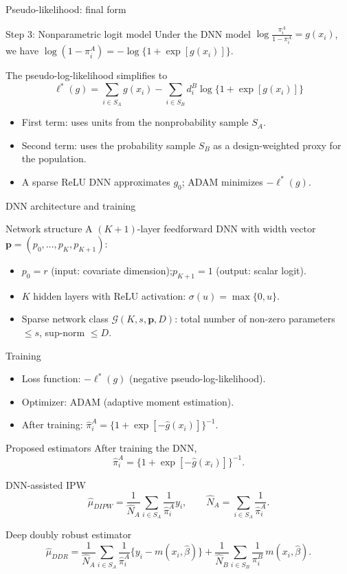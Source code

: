 \documentclass[aspectratio=169,11pt]{beamer}
\begin{document}
\begin{frame}{Pseudo-likelihood: final form}
\begin{block}{Step 3: Nonparametric logit model}
Under the DNN model $\log\frac{\pi_i^A}{1-\pi_i^A}=g(x_i)$, we have
$\log(1-\pi_i^A)=-\log\{1+\exp[g(x_i)]\}$.
\end{block}
The pseudo-log-likelihood simplifies to
\[
\boxed{\;\ell^*(g)=\sum_{i\in S_A} g(x_i)-\sum_{i\in S_B} d_i^B\log\{1+\exp[g(x_i)]\}\;}
\]
\begin{itemize}
  \item First term: uses units from the nonprobability sample $S_A$.
  \item Second term: uses the probability sample $S_B$ as a design-weighted proxy for the population.
  \item A sparse ReLU DNN approximates $g_0$; ADAM minimizes $-\ell^*(g)$.
\end{itemize}
\end{frame}

\begin{frame}{DNN architecture and training}
\begin{block}{Network structure}
A $(K+1)$-layer feedforward DNN with width vector $\mathbf{p}=(p_0,\ldots,p_K,p_{K+1})$:
\begin{itemize}
  \item $p_0=r$ (input: covariate dimension);\quad $p_{K+1}=1$ (output: scalar logit).
  \item $K$ hidden layers with ReLU activation: $\sigma(u)=\max\{0,u\}$.
  \item Sparse network class $\mathcal{G}(K,s,\mathbf{p},D)$: total number of non-zero parameters $\le s$, sup-norm $\le D$.
\end{itemize}
\end{block}
\begin{block}{Training}
\begin{itemize}
  \item Loss function: $-\ell^*(g)$ (negative pseudo-log-likelihood).
  \item Optimizer: ADAM (adaptive moment estimation).
  \item After training: $\hat{\pi}_i^A=\{1+\exp[-\hat{g}(x_i)]\}^{-1}$.
\end{itemize}
\end{block}
\end{frame}

\begin{frame}{Proposed estimators}
After training the DNN,
\[
\hat{\pi}_i^A=\{1+\exp[-\hat{g}(x_i)]\}^{-1}.
\]
\begin{block}{DNN-assisted IPW}
\[
\hat{\mu}_{DIPW}
=\frac{1}{\hat{N}_A}\sum_{i\in S_A}\frac{1}{\hat{\pi}_i^A}y_i,
\qquad
\hat{N}_A=\sum_{i\in S_A}\frac{1}{\hat{\pi}_i^A}.
\]
\end{block}
\begin{block}{Deep doubly robust estimator}
\[
\hat{\mu}_{DDR}
=\frac{1}{\hat{N}_A}\sum_{i\in S_A}\frac{1}{\hat{\pi}_i^A}\{y_i-m(x_i,\hat{\beta})\}
+\frac{1}{\hat{N}_B}\sum_{i\in S_B}\frac{1}{\pi_i^B}\,m(x_i,\hat{\beta}).
\]
\end{block}
\end{frame}
\end{document}
